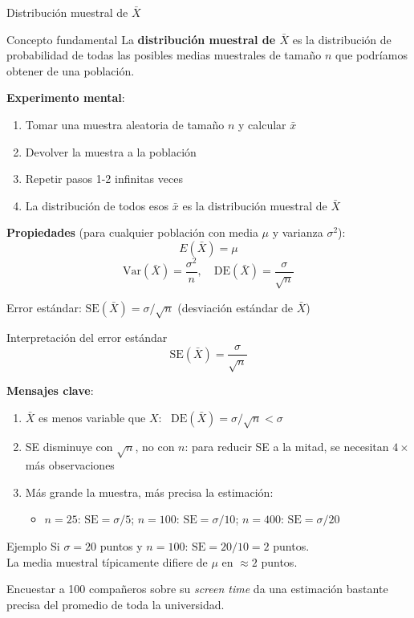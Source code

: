 \documentclass[aspectratio=169, 11pt]{beamer}
\begin{document}
\begin{frame}{Distribución muestral de $\bar{X}$}
\begin{block}{Concepto fundamental}
La \textbf{distribución muestral de $\bar{X}$} es la distribución de probabilidad de todas las posibles medias muestrales de tamaño $n$ que podríamos obtener de una población.
\end{block}

\textbf{Experimento mental}:
\begin{enumerate}
\item Tomar una muestra aleatoria de tamaño $n$ y calcular $\bar{x}$
\item Devolver la muestra a la población
\item Repetir pasos 1-2 infinitas veces
\item La distribución de todos esos $\bar{x}$ es la distribución muestral de $\bar{X}$
\end{enumerate}

\vspace{0.5em}
\textbf{Propiedades} (para cualquier población con media $\mu$ y varianza $\sigma^2$):
\[
E(\bar{X}) = \mu
\]
\[
\text{Var}(\bar{X}) = \frac{\sigma^2}{n}, \quad \text{DE}(\bar{X}) = \frac{\sigma}{\sqrt{n}}
\]

\alert{Error estándar}: $\text{SE}(\bar{X}) = \sigma/\sqrt{n}$ (desviación estándar de $\bar{X}$)
\end{frame}

\begin{frame}{Interpretación del error estándar}
\[
\text{SE}(\bar{X}) = \frac{\sigma}{\sqrt{n}}
\]

\textbf{Mensajes clave}:
\begin{enumerate}
\item \alert{$\bar{X}$ es menos variable que $X$}: \ $\text{DE}(\bar{X}) = \sigma/\sqrt{n} < \sigma$
\item \alert{SE disminuye con $\sqrt{n}$, no con $n$}: para reducir SE a la mitad, se necesitan $4\times$ más observaciones
\item \alert{Más grande la muestra, más precisa la estimación}:
  \begin{itemize}
  \item $n = 25$: $\text{SE} = \sigma/5$; \quad $n = 100$: $\text{SE} = \sigma/10$; \quad $n = 400$: $\text{SE} = \sigma/20$
  \end{itemize}
\end{enumerate}

\begin{exampleblock}{Ejemplo}
Si $\sigma = 20$ puntos y $n=100$: $\text{SE} = 20/10 = 2$ puntos.\\
La media muestral t\'ipicamente difiere de $\mu$ en $\approx 2$ puntos.

\smallskip
Encuestar a 100 compa\~neros sobre su \emph{screen time} da una estimaci\'on bastante precisa del promedio de toda la universidad.
\end{exampleblock}
\end{frame}
\end{document}
